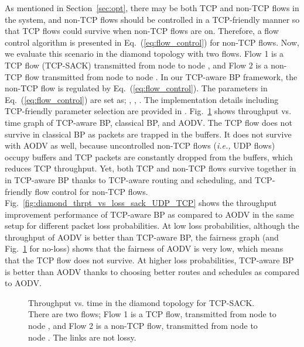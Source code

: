\documentclass[conference]{IEEEtran}
\newcommand{\ie}{{\em i.e., }}
\begin{document}
As mentioned in Section~\ref{sec:opt}, there may be both TCP and non-TCP flows in the system, and non-TCP flows should be controlled in a TCP-friendly manner so that TCP flows could survive when non-TCP flows are on. Therefore, a flow control algorithm is presented in Eq.~(\ref{eq:flow_control}) for non-TCP flows. Now, we evaluate this scenario in the diamond topology with two flows. Flow 1 is a TCP flow (TCP-SACK) transmitted from node  to node , and Flow 2 is a non-TCP flow transmitted from node  to node . In our TCP-aware BP framework, the non-TCP flow is regulated by Eq.~(\ref{eq:flow_control}). The parameters in Eq.~(\ref{eq:flow_control}) are set as; , , . The implementation details including TCP-friendly parameter selection are provided in \cite{tcp_aware_bp_tech_rep}.
Fig.~\ref{fig:diamond_thrpt_time_results_tcp_udp} shows throughput vs. time graph of TCP-aware BP, classical BP, and AODV. The TCP flow does not survive in classical BP as packets are trapped in the buffers. It does not survive with AODV as well, because uncontrolled non-TCP flows (\ie UDP flows) occupy buffers and TCP packets are constantly dropped from the buffers, which reduces TCP throughput. Yet, both TCP and non-TCP flows survive together in in TCP-aware BP thanks to TCP-aware routing and scheduling, and TCP-friendly flow control for non-TCP flows. Fig.~\ref{fig:diamond_thrpt_vs_loss_sack_UDP_TCP} shows the throughput improvement performance of TCP-aware BP as compared to AODV in the same setup for different packet loss probabilities. At low loss probabilities, although the throughput of AODV is better than TCP-aware BP, the fairness graph (and Fig.~\ref{fig:diamond_thrpt_time_results_tcp_udp} for no-loss) shows that the fairness of AODV is very low, which means that the TCP flow does not survive. At higher loss probabilities, TCP-aware BP is better than AODV thanks to choosing better routes and schedules as compared to AODV.


\begin{figure}[t!]
\vspace{-0pt}
\begin{center}
 \hspace{-0pt}
\end{center}
\begin{center}
\vspace{-5pt}
\caption{\label{fig:diamond_thrpt_time_results_tcp_udp} \scriptsize Throughput vs. time in the diamond topology for TCP-SACK. There are two flows; Flow 1 is a TCP flow, transmitted from node  to node , and Flow 2 is a non-TCP flow, transmitted from node  to node . The links are not lossy.
}
\end{center}
\vspace{-15pt}
\end{figure}
\end{document}
